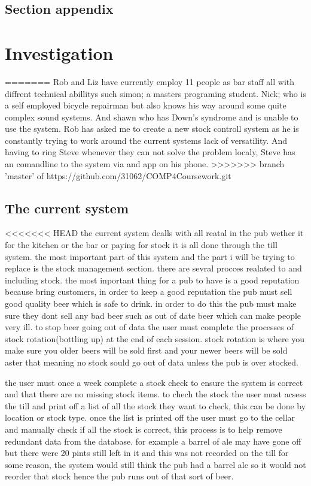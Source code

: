 \subsection{Section appendix}

\section{Investigation}
=======
Rob and Liz have currently employ 11 people as bar staff all with diffrent technical abillitys such simon; a masters programing student. Nick; who is a self employed bicycle repairman but also knows his way around some quite complex sound systems. And shawn who has Down's syndrome and is unable to use the system. Rob has asked me to create a new stock controll system as he is constantly trying to work around the current systems lack of versatility. And having to ring Steve whenever they can not solve the problem localy, Steve has an comandline to the system via and app on his phone.
>>>>>>> branch 'master' of https://github.com/31062/COMP4Coursework.git

\subsection{The current system}

<<<<<<< HEAD
the current system dealls with all reatal in the pub wether it for the kitchen or the bar or paying for stock it is all done through the till system. the most important part of this system and the part i will be trying to replace is the stock management section. there are sevral procces realated to and including stock. the most inportant thing for a pub to have is a good reputation because bring customers, in order to keep a good reputation the pub must sell good quality beer which is safe to drink. in order to do this the pub must make sure they dont sell any bad beer such as out of date beer which can make people very ill. to stop beer going out of data the user must complete the processes of stock rotation(bottling up) at the end of each session. stock rotation is where you make sure you older beers will be sold first and your newer beers will be sold aster that meaning no stock sould go out of data unless the pub is over stocked.

the user must once a week complete a stock check to ensure the system is correct and that there are no missing stock items. to chech the stock the user must acsess the till and  print off a list of all the stock they want to check, this can be done by location or stock type. once the list is printed off the user must go to the cellar and manually check if all the stock is correct, this process is to help remove redundant data from the database. for example a barrel of ale may have gone off but there were 20 pints still left in it and this was not recorded on the till for some reason, the system would still think the pub had a barrel ale so it would not reorder that stock hence the pub runs out of that sort of beer.

